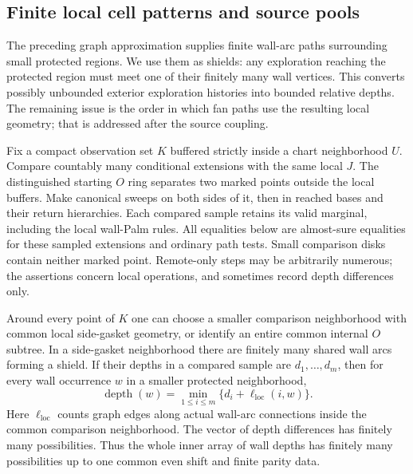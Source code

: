 \subsection{Finite local cell patterns and source pools}

The preceding graph approximation supplies finite wall-arc paths surrounding
small protected regions. We use them as shields: any exploration reaching
the protected region must meet one of their finitely many wall vertices.
This converts possibly unbounded exterior exploration histories into bounded
relative depths. The remaining issue is the order in which fan paths use
the resulting local geometry; that is addressed after the source coupling.


Fix a compact observation set $K$ buffered strictly inside a chart neighborhood $U$.  Compare countably many conditional extensions with the same local $J$.  The distinguished starting $O$ ring separates two marked points outside the local buffers.  Make canonical sweeps on both sides of it, then in reached bases and their return hierarchies.  Each compared sample retains its valid marginal, including the local wall-Palm rules.  All equalities below are almost-sure equalities for these sampled extensions and ordinary path tests.  Small comparison disks contain neither marked point.  Remote-only steps may be arbitrarily numerous; the assertions concern local operations, and sometimes record depth differences only.

\begin{lemma}\label{wall:shield-depth}
Around every point of $K$ one can choose a smaller comparison neighborhood with common local side-gasket geometry, or identify an entire common internal $O$ subtree.  In a side-gasket neighborhood there are finitely many shared wall arcs forming a shield.  If their depths in a compared sample are $d_1,\ldots,d_m$, then for every wall occurrence $w$ in a smaller protected neighborhood,
\begin{equation}\label{wall:shield-formula}
\operatorname{depth}(w)=\min_{1\le i\le m}
\{d_i+\ell_{\mathrm{loc}}(i,w)\}.
\end{equation}
Here $\ell_{\mathrm{loc}}$ counts graph edges along actual wall-arc connections inside the common comparison neighborhood.  The vector of depth differences has finitely many possibilities.  Thus the whole inner array of wall depths has finitely many possibilities up to one common even shift and finite parity data.
\end{lemma}

